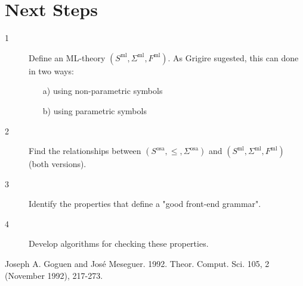 \documentclass{article}
\theoremstyle{definition}
\theoremstyle{definition}
\theoremstyle{definition}
\theoremstyle{definition}
\theoremstyle{definition}
\theoremstyle{theorem}
\theoremstyle{theorem}
\theoremstyle{theorem}
\theoremstyle{theorem}
\theoremstyle{theorem}
\begin{document}
{\section{Next Steps}

\begin{description}
\item[1] Define an ML-theory $(S^\textrm{ml},\Sigma^\textrm{ml},F^\textrm{ml})$. As Grigire sugested, this can done in two ways:
\begin{enumerate}
\item[a)] using non-parametric symbols
\item[b)] using parametric symbols
\end{enumerate}
\item[2] Find the relationships between $(S^\textrm{osa},\le, \Sigma^\textrm{osa})$ and  $(S^\textrm{ml},\Sigma^\textrm{ml},F^\textrm{ml})$ (both versions).
\item[3] Identify the properties that define a "good front-end grammar".
\item[4] Develop algorithms for checking these properties.
\end{description}
}

\begin{thebibliography}{ABC99a}

Joseph A. Goguen and José Meseguer. 1992. 
\newblock Theor. Comput. Sci. 105, 2 (November 1992), 217-273.

\end{thebibliography}
\end{document}
